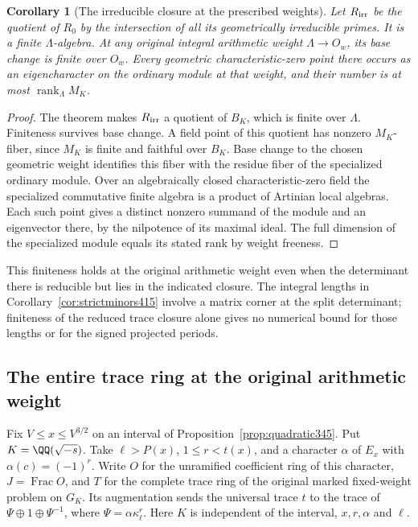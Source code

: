 \documentclass[a4paper,11pt]{article}
\newtheorem{corollary}[proposition]{Corollary}
\theoremstyle{definition}
\theoremstyle{remark}
\numberwithin{equation}{section}
\begin{document}
\begin{corollary}[The irreducible closure at the prescribed weights]\leavevmode
\label{cor:irreducibleweight423}
Let \(R_{\rm irr}\) be the quotient of \(R_0\) by the
intersection of all its geometrically irreducible primes.
It is a finite \(\Lambda\)-algebra. At any original integral
arithmetic weight \(\Lambda\to O_w\), its base change is
finite over \(O_w\). Every geometric characteristic-zero
point there occurs as an eigencharacter on the ordinary module
at that weight, and their number is at most
\(\operatorname{rank}_{\Lambda}M_K\).
\end{corollary}
\begin{proof}
The theorem makes \(R_{\rm irr}\) a quotient of \(B_K\), which
is finite over \(\Lambda\). Finiteness survives base change.
A field point of this quotient has nonzero \(M_K\)-fiber, since
\(M_K\) is finite and faithful over \(B_K\). Base change to the
chosen geometric weight identifies this fiber with the residue
fiber of the specialized ordinary module. Over an algebraically
closed characteristic-zero field the specialized commutative
finite algebra is a product of Artinian local algebras. Each
such point gives a distinct nonzero summand of the module and
an eigenvector there, by the nilpotence of its maximal ideal.
The full dimension of the specialized module equals its stated
rank by weight freeness.
\end{proof}

This finiteness holds at the original arithmetic weight even
when the determinant there is reducible but lies in the indicated
closure. The integral lengths in Corollary~\ref{cor:strictminors415}
involve a matrix corner at the split determinant; finiteness of
the reduced trace closure alone gives no numerical bound for
those lengths or for the signed projected periods.


\subsection{The entire trace ring at the original arithmetic weight}
\label{sec:originalfixedhecke424}

Fix \(V\le x\le V^{3/2}\) on an interval of
Proposition~\ref{prop:quadratic345}. Put \(K=\QQ(\sqrt{-s})\).
Take \(\ell>P(x)\), \(1\le r<t(x)\), and a character \(\alpha\)
of \(E_x\) with \(\alpha(c)=(-1)^r\). Write \(O\) for the
unramified coefficient ring of this character, \(J=\operatorname{Frac}O\),
and \(T\) for the complete trace ring of the original marked
fixed-weight problem on \(G_K\). Its augmentation sends the
universal trace \(t\) to the trace of
\(\Psi\oplus1\oplus\Psi^{-1}\), where \(\Psi=\alpha\kappa_\ell^r\).
Here \(K\) is independent of the interval, \(x,r,\alpha\) and \(\ell\).
\end{document}
